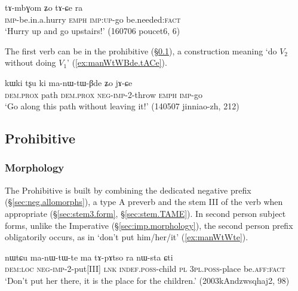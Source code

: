 \begin{exe}
\ex  \label{ex:tAmbGom.tACe}
\gll tɤ-mbɣom ʑo tɤ-ɕe ra\\
\textsc{imp}-be.in.a.hurry \textsc{emph} \textsc{imp}:\textsc{up}-go be.needed:\textsc{fact} \\
\glt `Hurry up and go upstairs!' (160706 poucet6, 6)
\end{exe}

The first verb can be in the prohibitive (§\ref{sec:prohibitive}), a construction meaning `do $V_2$ without doing $V_1$' (\ref{ex:manWtWBde.tACe}).

\begin{exe}
\ex  \label{ex:manWtWBde.tACe}
\gll kɯki tʂu ki ma-nɯ-tɯ-βde ʑo jɤ-ɕe \\
\textsc{dem}.\textsc{prox} path \textsc{dem}.\textsc{prox} \textsc{neg}-\textsc{imp}-2-throw \textsc{emph} \textsc{imp}-go \\
\glt `Go along this path without leaving it!' (140507 jinniao-zh, 212)
\end{exe}

\subsection{Prohibitive} \label{sec:prohibitive}
 
\subsubsection{Morphology} \label{sec:prohibitive.morpho}
The Prohibitive is built by combining the dedicated negative prefix  (§\ref{sec:neg.allomorphs}), a type A preverb and the stem III of the verb when appropriate (§\ref{sec:stem3.form}, §\ref{sec:stem.TAME}). In second person subject forms, unlike the Imperative (§\ref{sec:imp.morphology}), the second person prefix obligatorily occurs, as in  `don't put him/her/it' (\ref{ex:manWtWte}).

\begin{exe}
\ex  \label{ex:manWtWte}
\gll nɯtɕu ma-nɯ-tɯ-te ma tɤ-pɤtso ra nɯ-sta ɕti \\
\textsc{dem}:\textsc{loc} \textsc{neg}-\textsc{imp}-2-put[III] \textsc{lnk} \textsc{indef}.\textsc{poss}-child \textsc{pl} \textsc{3pl}.\textsc{poss}-place be.\textsc{aff}:\textsc{fact} \\
\glt `Don't put her there, it is the place for the children.' (2003kAndzwsqhaj2, 98)
\end{exe}


